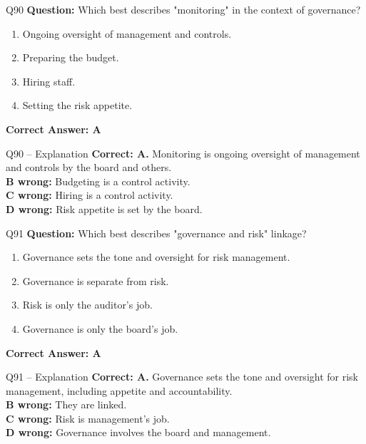 \documentclass[aspectratio=169,10pt]{beamer}
\begin{document}
	\begin{frame}[t]{Q90}
		\small
		\textbf{Question:} Which best describes "monitoring" in the context of governance?
		\begin{enumerate}[label=\Alph*.,itemsep=1pt,topsep=2pt]
			\item Ongoing oversight of management and controls.
			\item Preparing the budget.
			\item Hiring staff.
			\item Setting the risk appetite.
		\end{enumerate}
		\vspace{4pt}
		\textbf{Correct Answer: A}
	\end{frame}
	
	\begin{frame}[t]{Q90 -- Explanation}
		\small
		\textbf{Correct: A.} Monitoring is ongoing oversight of management and controls by the board and others. \\[4pt]
		\textbf{B wrong:} Budgeting is a control activity. \\[2pt]
		\textbf{C wrong:} Hiring is a control activity. \\[2pt]
		\textbf{D wrong:} Risk appetite is set by the board.
	\end{frame}
	
	\begin{frame}[t]{Q91}
		\small
		\textbf{Question:} Which best describes "governance and risk" linkage?
		\begin{enumerate}[label=\Alph*.,itemsep=1pt,topsep=2pt]
			\item Governance sets the tone and oversight for risk management.
			\item Governance is separate from risk.
			\item Risk is only the auditor's job.
			\item Governance is only the board's job.
		\end{enumerate}
		\vspace{4pt}
		\textbf{Correct Answer: A}
	\end{frame}
	
	\begin{frame}[t]{Q91 -- Explanation}
		\small
		\textbf{Correct: A.} Governance sets the tone and oversight for risk management, including appetite and accountability. \\[4pt]
		\textbf{B wrong:} They are linked. \\[2pt]
		\textbf{C wrong:} Risk is management's job. \\[2pt]
		\textbf{D wrong:} Governance involves the board and management.
	\end{frame}
	
\end{document}
